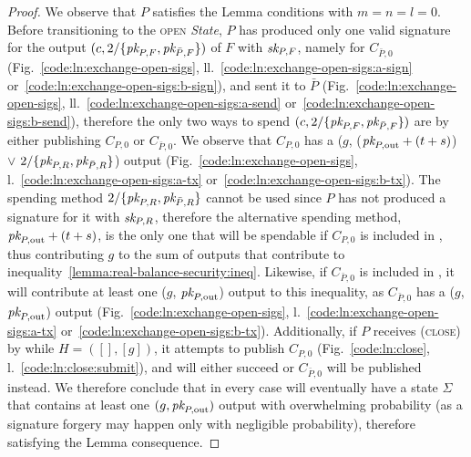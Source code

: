\begin{proof}
  We observe that $P$ satisfies the Lemma conditions with $m = n = l = 0$.
  Before transitioning to the \textsc{open} \textit{State}, $P$ has produced
  only one valid signature for the output $(c, 2/\{\textit{pk}_{P, F}, \textit{pk}_{\bar{P},
  F}\})$ of $F$ with $\textit{sk}_{P, F}$, namely for $C_{\bar{P}, 0}$
  (Fig.~\ref{code:ln:exchange-open-sigs},
  ll.~\ref{code:ln:exchange-open-sigs:a-sign}
  or~\ref{code:ln:exchange-open-sigs:b-sign}), and sent it to $\bar{P}$
  (Fig.~\ref{code:ln:exchange-open-sigs},
  ll.~\ref{code:ln:exchange-open-sigs:a-send}
  or~\ref{code:ln:exchange-open-sigs:b-send}), therefore the only two ways to
  spend $(c, 2/\{\textit{pk}_{P, F}, \textit{pk}_{\bar{P}, F}\})$ are by either publishing $C_{P,
  0}$ or $C_{\bar{P}, 0}$. We observe that $C_{P, 0}$ has a ($g$, ($\textit{pk}_{P,
  \mathrm{out}} + (t + s)$) $\vee$ $2/\{\textit{pk}_{P, R}, \textit{pk}_{\bar{P}, R}\}$) output
  (Fig.~\ref{code:ln:exchange-open-sigs},
  l.~\ref{code:ln:exchange-open-sigs:a-tx}
  or~\ref{code:ln:exchange-open-sigs:b-tx}). The spending method $2/\{\textit{pk}_{P, R},
  \textit{pk}_{\bar{P}, R}\}$ cannot be used since $P$ has not produced a signature for
  it with $\textit{sk}_{P, R}$, therefore the alternative spending method, $\textit{pk}_{P,
  \mathrm{out}} + (t + s)$, is the only one that will be spendable if $C_{P, 0}$
  is included in \ledger, thus contributing $g$ to the sum of outputs that
  contribute to inequality~\ref{lemma:real-balance-security:ineq}. Likewise, if
  $C_{\bar{P}, 0}$ is included in \ledger, it will contribute at least one ($g$,
  $\textit{pk}_{P, \mathrm{out}}$) output to this inequality, as $C_{\bar{P}, 0}$ has a
  ($g$, $\textit{pk}_{P, \mathrm{out}}$) output (Fig.~\ref{code:ln:exchange-open-sigs},
  l.~\ref{code:ln:exchange-open-sigs:a-tx}
  or~\ref{code:ln:exchange-open-sigs:b-tx}). Additionally, if $P$ receives
  (\textsc{close}) by \environment while $H = ([], [g])$, it attempts to publish
  $C_{P, 0}$ (Fig.~\ref{code:ln:close}, l.~\ref{code:ln:close:submit}), and will
  either succeed or $C_{\bar{P}, 0}$ will be published instead. We therefore
  conclude that in every case \ledger will eventually have a state $\Sigma$ that
  contains at least one $(g, \textit{pk}_{P, \mathrm{out}})$ output with overwhelming
  probability (as a signature forgery may happen only with negligible
  probability), therefore satisfying the Lemma consequence.


\end{proof}
